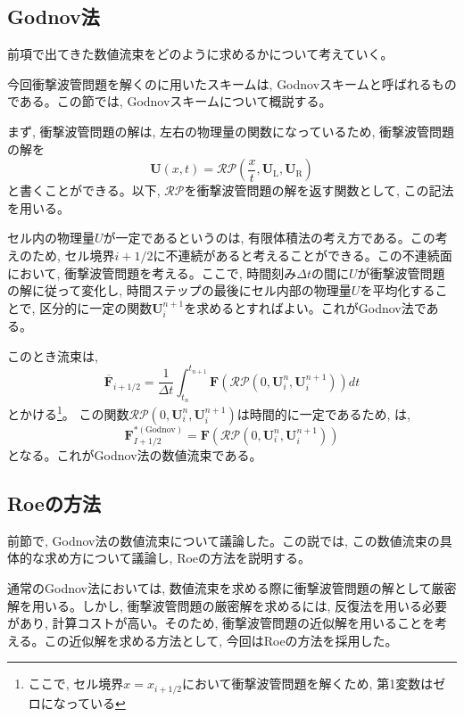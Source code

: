 \documentclass[dvipdfmx,b5paper]{jsarticle}
\begin{document}
\subsection{Godnov法}
前項で出てきた数値流束をどのように求めるかについて考えていく。

今回衝撃波管問題を解くのに用いたスキームは, Godnovスキームと呼ばれるものである。この節では, Godnovスキームについて概説する。

まず, 衝撃波管問題の解は, 左右の物理量の関数になっているため, 衝撃波管問題の解を
\begin{equation}
  \bm{U}(x, t)=\mathcal{RP}\left(\frac{x}{t}, \bm{U}_{\mathrm{L}}, \bm{U}_{\mathrm{R}}\right)
\end{equation}
と書くことができる。以下, $\mathcal{RP}$を衝撃波管問題の解を返す関数として, この記法を用いる。

セル内の物理量$U$が一定であるというのは, 有限体積法の考え方である。この考えのため, セル境界$i+1/2$に不連続があると考えることができる。この不連続面において, 衝撃波管問題を考える。ここで, 時間刻み$\Delta t$の間に$U$が衝撃波管問題の解に従って変化し, 時間ステップの最後にセル内部の物理量$U$を平均化することで, 区分的に一定の関数$\bm{U}_{i}^{n+1}$を求めるとすればよい。これがGodnov法である。

このとき流束は, 
\begin{equation}
  \overline{\bm{F}}_{i+1/2}=\frac{1}{\Delta t}\int_{t_{n}}^{t_{n+1}}\bm{F}(\mathcal{RP}(0, \bm{U}_{i}^{n}, \bm{U}_{i}^{n+1}))dt
  \label{flux_calc}
\end{equation}
とかける\footnote{ここで, セル境界$x=x_{i+1/2}$において衝撃波管問題を解くため, 第1変数はゼロになっている}。
この関数$\mathcal{RP}(0, \bm{U}_{i}^{n}, \bm{U}_{i}^{n+1})$は時間的に一定であるため, は, 
\begin{equation}
  \bm{F}_{I+1/2}^{*\mathrm{(Godnov)}}=\bm{F}(\mathcal{RP}(0, \bm{U}_{i}^{n}, \bm{U}_{i}^{n+1}))
\end{equation}
となる。これがGodnov法の数値流束である。

\subsection{Roeの方法}

前節で, Godnov法の数値流束について議論した。この説では, この数値流束の具体的な求め方について議論し, Roeの方法を説明する。

通常のGodnov法においては, 数値流束を求める際に衝撃波管問題の解として厳密解を用いる。しかし, 衝撃波管問題の厳密解を求めるには, 反復法を用いる必要があり, 計算コストが高い。そのため, 衝撃波管問題の近似解を用いることを考える。この近似解を求める方法として, 今回はRoeの方法を採用した。
\end{document}
